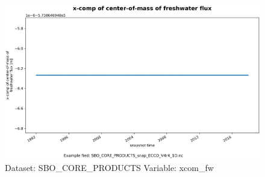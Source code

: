 \begin{figure}[H]
\centering
\includegraphics[width=\textwidth]{../images/plots/oneD_plots/SBO_Core_Products/xcom_fw.png}
\caption{Dataset: SBO\_CORE\_PRODUCTS Variable: xcom\_fw}
\label{tab:table-SBO_CORE_PRODUCTS_xcom_fw-Plot}
\end{figure}
\pagebreak
